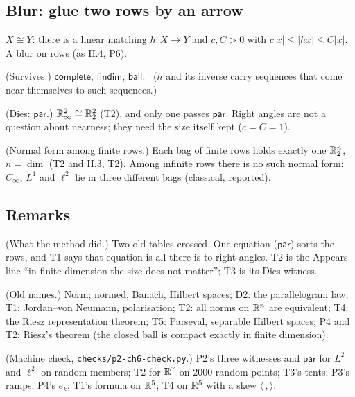 \subsection*{Blur: glue two rows by an arrow}

\begin{lines}
\item[\lab{D6}] $X \cong Y$: there is a linear matching $h : X \to Y$ and $c, C > 0$ with $c|x| \le |hx| \le C|x|$. A blur on rows (as II.4, P6).
\item[\lab{P5}] (Survives.) $\mathsf{complete}$, $\mathsf{findim}$, $\mathsf{ball}$. \ ($h$ and its inverse carry sequences that come near themselves to such sequences.)
\item[\lab{P6}] (Dies: $\mathsf{par}$.) $\mathbb{R}^2_\infty \cong \mathbb{R}^2_2$ (T2), and only one passes $\mathsf{par}$. Right angles are not a question about nearness; they need the size itself kept ($c = C = 1$).
\item[\lab{P7}] (Normal form among finite rows.) Each bag of finite rows holds exactly one $\mathbb{R}^n_2$, $n = \dim$ (T2 and II.3, T2). Among infinite rows there is no such normal form: $C_\infty$, $L^1$ and $\ell^2$ lie in three different bags (classical, reported).
\end{lines}

\subsection*{Remarks}

\begin{lines}
\item[\lab{R1}] (What the method did.) Two old tables crossed. One equation ($\mathsf{par}$) sorts the rows, and T1 says that equation is all there is to right angles. T2 is the Appears line ``in finite dimension the size does not matter''; T3 is its Dies witness.
\item[\lab{R2}] (Old names.) Norm; normed, Banach, Hilbert spaces; D2: the parallelogram law; T1: Jordan--von Neumann, polarisation; T2: all norms on $\mathbb{R}^n$ are equivalent; T4: the Riesz representation theorem; T5: Parseval, separable Hilbert spaces; P4 and T2: Riesz's theorem (the closed ball is compact exactly in finite dimension).
\item[\lab{R3}] (Machine check, \texttt{checks/p2-ch6-check.py}.) P2's three witnesses and $\mathsf{par}$ for $L^2$ and $\ell^2$ on random members; T2 for $\mathbb{R}^7$ on $2000$ random points; T3's tents; P3's ramps; P4's $e_k$; T1's formula on $\mathbb{R}^5$; T4 on $\mathbb{R}^5$ with a skew $\langle\,,\rangle$.
\end{lines}


